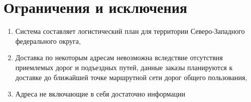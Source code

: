\section{Ограничения и исключения}
\label{sec:limit}
\begin{enumerate}[label=LMT-\arabic*]
    \item Система составляет логистический план для территории Северо-Западного федерального округа,
    \item Доставка по некоторым адресам невозможна вследствие отсутствия приемлемых дорог и подъездных путей, данные заказы планируются к доставке до ближайшей точке маршрутной сети дорог общего пользования,
    \item Адреса не включающие в себя достаточно информации
\end{enumerate}

\endinput
